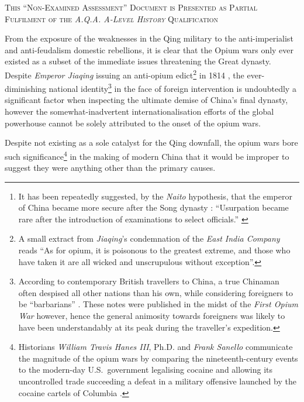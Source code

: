 \documentclass[a4paper,oneside]{article}
\newcommand{\textrule}{\noindent\makebox[\linewidth]{\rule{\linewidth}{0.4pt}}}
\begin{document}
\begin{abstract}
        This essay will discuss the factors which led to the downfall of the
        greatest dynasty\footnote{It has been repeatedly suggested, by the
        \textit{Naito} hypothesis, that the emperor of China became more secure
        after the Song dynasty \autocite{Miyakawa:1955}: ``Usurpation became
        rare after the introduction of examinations to select officials.''
        \autocite{Sng:2014}} in the history of China. Also under examination
        will be the extent to which the strained international trade relations
        with the \textit{East India Company} and the ensuing Opium wars
        contributed to the ultimate demise of 1912.

\end{abstract}

\textrule%
\vspace*{0.6em}
{
        \centering \textsc{This ``Non-Examined Assessment'' Document is
        Presented as Partial Fulfilment of the \textit{A.Q.A. A-Level History}
        Qualification}\\
}
\textrule%
\vspace*{0.6em}

From the exposure of the weaknesses in the Qing military to the anti-imperialist
and anti-feudalism domestic rebellions, it is clear that the Opium wars only
ever existed as a subset of the immediate issues threatening the Great dynasty.
Despite \textit{Emperor Jiaqing} issuing an anti-opium edict\footnote{A small
extract from \textit{Jiaqing}'s condemnation of the \textit{East India Company}
reads ``As for opium, it is poisonous to the greatest extreme, and those who
have taken it are all wicked and unscrupulous without exception''.} in 1814
\autocite{Hu:1991}, the ever-diminishing national identity\footnote{According to
contemporary British travellers to China, a true Chinaman often despised all
other nations than his own, while considering foreigners to be ``barbarians''
\autocite{McPherson:1842}.  These notes were published in the midst of the
\textit{First Opium War} however, hence the general animosity towards foreigners
was likely to have been understandably at its peak during the traveller's
expedition.} in the face of foreign intervention is undoubtedly a significant
factor when inspecting the ultimate demise of China's final dynasty, however the
somewhat-inadvertent internationalisation efforts of the global powerhouse
cannot be solely attributed to the onset of the opium wars.

Despite not existing as a sole catalyst for the Qing downfall, the opium wars
bore such significance\footnote{Historians \textit{William Travis Hanes III},
Ph.D. and \textit{Frank Sanello} communicate the magnitude of the opium wars by
comparing the nineteenth-century events to the modern-day U.S.\ government
legalising cocaine and allowing its uncontrolled trade succeeding a defeat in a
military offensive launched by the cocaine cartels of Columbia
\autocite{Hanes:2004}.} in the making of modern China that it would be improper
to suggest they were anything other than the primary causes.
\end{document}

